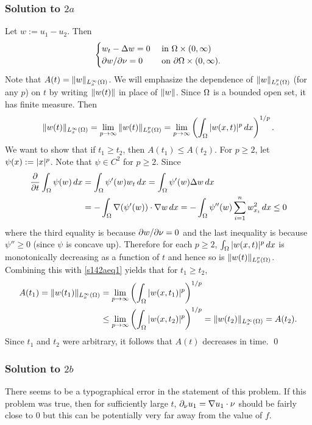 \subsubsection*{Solution to $2a$}
Let $w := u_{1} - u_{2}$. Then
\begin{equation*}
\begin{cases}
w_{t} - \Delta w = 0 & \text{ in } \Omega \times (0, \infty)\\
\partial w/\partial \nu = 0 & \text{ on } \partial\Omega \times (0, \infty).
\end{cases}
\end{equation*}
Note that $A(t) = \| w \|_{L_{x}^{\infty}(\Omega)}$. We will emphasize the dependence of $\| w \|_{L_{x}^{p}(\Omega)}$ (for any $p$) on $t$ by writing
$\| w(t) \|$ in place of $\| w \|$. Since $\Omega$ is a bounded open set, it has finite measure. Then
\begin{align}\label{s142aeq1}
\| w(t) \|_{L_{x}^{\infty}(\Omega)} = \lim_{p \rightarrow \infty}\| w(t) \|_{L_{x}^{p}(\Omega)} = \lim_{p \rightarrow \infty}\left(\int_{\Omega}|w(x, t)|^{p}\, dx\right)^{1/p}.
\end{align}
We want to show that if $t_{1} \geq t_{2}$, then $A(t_{1}) \leq A(t_{2})$. For $p \geq 2$, let $\psi(x) := |x|^{p}$. Note that $\psi \in C^{2}$ for $p \geq 2$.
Since
\begin{align*}
\frac{\partial}{\partial t}\int_{\Omega}\psi(w)\, dx &= \int_{\Omega}\psi'(w) w_{t}\, dx = \int_{\Omega}\psi'(w)\Delta w\, dx\\
& = -\int_{\Omega}\nabla(\psi'(w))\cdot \nabla w\, dx = -\int_{\Omega}\psi''(w)\sum_{i = 1}^{n}w_{x_{i}}^{2}\, dx \leq 0
\end{align*}
where the third equality is because $\partial w/\partial\nu = 0$ and the last inequality is because $\psi'' \geq 0$ (since $\psi$ is concave up).
Therefore for each $p \geq 2$, $\int_{\Omega}|w(x, t)|^{p}\, dx$ is monotonically decreasing as a function of $t$ and hence so is $\| w(t) \|_{L^{p}_{x}(\Omega)}$.
Combining this with \eqref{s142aeq1} yields that for $t_{1} \geq t_{2}$,
\begin{align*}
A(t_{1}) = \| w(t_{1}) \|_{L_{x}^{\infty}(\Omega)} &= \lim_{p \rightarrow \infty}\left(\int_{\Omega}|w(x,t_{1})|^{p}\right)^{1/p} \\
&\leq \lim_{p \rightarrow \infty}\left(\int_{\Omega}|w(x,t_{2})|^{p}\right)^{1/p} =\| w(t_{2}) \|_{L_{x}^{\infty}(\Omega)} = A(t_{2}).
\end{align*}
Since $t_{1}$ and $t_{2}$ were arbitrary, it follows that $A(t)$ decreases in time.
\hfill\qed

\subsubsection*{Solution to $2b$}
There seems to be a typographical error in the statement of this problem. If this problem was true, then
for sufficiently large $t$, $\partial_{\nu}u_{1} = \nabla u_{1} \cdot \nu$ should be fairly close to $0$ but this can be potentially very
far away from the value of $f$.

